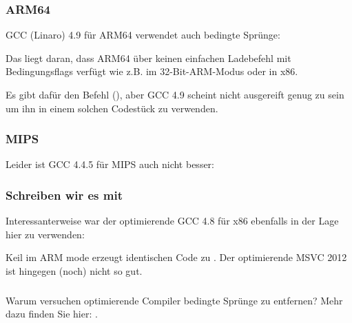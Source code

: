 

\subsubsection{ARM64}

\Optimizing GCC (Linaro) 4.9 für ARM64 verwendet auch bedingte Sprünge:

 Das liegt daran, dass ARM64 über keinen
einfachen Ladebefehl mit Bedingungsflags verfügt wie z.B.  im 32-Bit-ARM-Modus oder  in x86.

Es gibt dafür den  Befehl (), aber GCC 4.9
scheint nicht ausgereift genug zu sein um ihn in einem solchen Codestück zu verwenden.

\subsubsection{MIPS}

Leider ist GCC 4.4.5 für MIPS auch nicht besser:



\subsubsection{Schreiben wir es mit }



Interessanterweise war der optimierende GCC 4.8 für x86 ebenfalls in der Lage  hier zu verwenden:



\Optimizing Keil im ARM mode erzeugt identischen Code zu .
Der optimierende MSVC 2012 ist hingegen (noch) nicht so gut.

\subsubsection{\Conclusion{}}
Warum versuchen optimierende Compiler bedingte Sprünge zu entfernen? Mehr dazu finden Sie hier:
.
